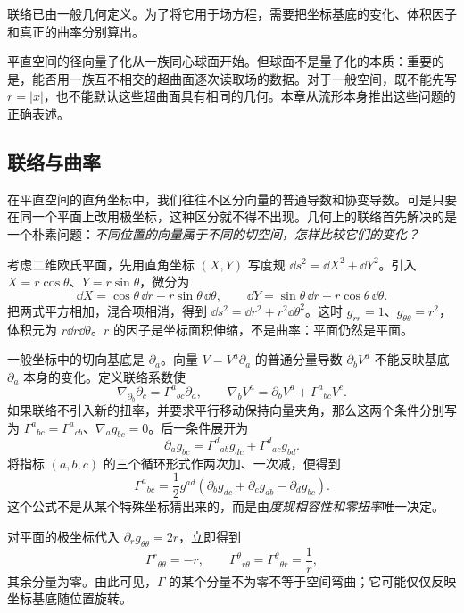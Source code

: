 
联络已由一般几何定义。为了将它用于场方程，需要把坐标基底的变化、体积因子和真正的曲率分别算出。





平直空间的径向量子化从一族同心球面开始。但球面不是量子化的本质：重要的是，能否用一族互不相交的超曲面逐次读取场的数据。对于一般空间，既不能先写 $r=|x|$，也不能默认这些超曲面具有相同的几何。本章从流形本身推出这些问题的正确表述。

\subsection{联络与曲率}
\label{sec:ghs-connection-curvature}

在平直空间的直角坐标中，我们往往不区分向量的普通导数和协变导数。可是只要在同一个平面上改用极坐标，这种区分就不得不出现。几何上的联络首先解决的是一个朴素问题：\emph{不同位置的向量属于不同的切空间，怎样比较它们的变化？}

考虑二维欧氏平面，先用直角坐标 $(X,Y)$ 写度规 $\dd s^2=\dd X^2+\dd Y^2$。引入 $X=r\cos\theta$、$Y=r\sin\theta$，微分为
\[
 \dd X=\cos\theta\,\dd r-r\sin\theta\,\dd\theta,\qquad
 \dd Y=\sin\theta\,\dd r+r\cos\theta\,\dd\theta.
\]
把两式平方相加，混合项相消，得到 $\dd s^2=\dd r^2+r^2\dd\theta^2$。这时 $g_{rr}=1$、$g_{\theta\theta}=r^2$，体积元为 $r\dd r\dd\theta$。$r$ 的因子是坐标面积伸缩，不是曲率：平面仍然是平面。

一般坐标中的切向基底是 $\partial_a$。向量 $V=V^a\partial_a$ 的普通分量导数 $\partial_bV^a$ 不能反映基底 $\partial_a$ 本身的变化。定义联络系数使
\begin{equation}\label{eq:ghs-bridge-christoffel-definition}
 \nabla_{\partial_b}\partial_c=\Gamma^a{}_{bc}\partial_a,
 \qquad\nabla_bV^a=\partial_bV^a+\Gamma^a{}_{bc}V^c.
\end{equation}
如果联络不引入新的扭率，并要求平行移动保持向量夹角，那么这两个条件分别写为 $\Gamma^a{}_{bc}=\Gamma^a{}_{cb}$、$\nabla_ag_{bc}=0$。后一条件展开为
\[
 \partial_ag_{bc}=\Gamma^d{}_{ab}g_{dc}+\Gamma^d{}_{ac}g_{bd}.
\]
将指标 $(a,b,c)$ 的三个循环形式作两次加、一次减，便得到
\begin{equation}\label{eq:ghs-bridge-Christoffel-metric}
 \Gamma^a{}_{bc}=\frac12g^{ad}
 (\partial_bg_{dc}+\partial_cg_{db}-\partial_dg_{bc}).
\end{equation}
这个公式不是从某个特殊坐标猜出来的，而是由\emph{度规相容性和零扭率}唯一决定。

对平面的极坐标代入 $\partial_rg_{\theta\theta}=2r$，立即得到
\[
 \Gamma^r{}_{\theta\theta}=-r,\qquad
 \Gamma^\theta{}_{r\theta}=\Gamma^\theta{}_{\theta r}=\frac1r,
\]
其余分量为零。由此可见，$\Gamma$ 的某个分量不为零不等于空间弯曲；它可能仅仅反映坐标基底随位置旋转。

